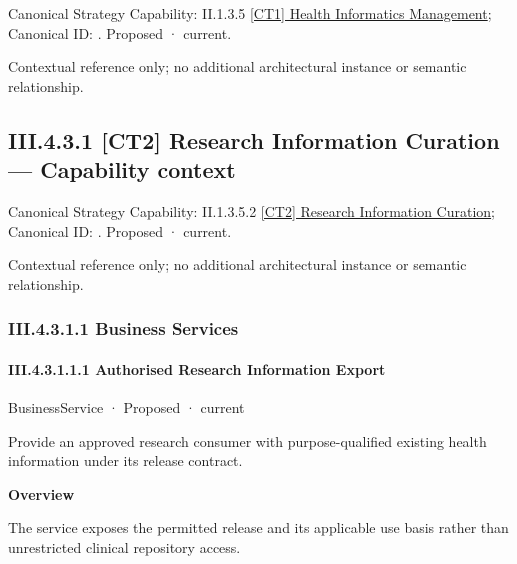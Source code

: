 {\small Canonical Strategy Capability: II.1.3.5 \hyperref[element:a790b5f2c5a1497fa6ec09d7824da32e]{[CT1] Health Informatics Management}; Canonical ID: \texttt{}. Proposed · current.}\par
Contextual reference only; no additional architectural instance or semantic relationship.\par
\subsection*{III.4.3.1 [CT2] Research Information Curation — Capability context}
\label{navigation:III.4.3.1}

{\small Canonical Strategy Capability: II.1.3.5.2 \hyperref[element:4f5b8cec90324c2989cdc30e80bc8cb9]{[CT2] Research Information Curation}; Canonical ID: \texttt{}. Proposed · current.}\par
Contextual reference only; no additional architectural instance or semantic relationship.\par
\subsubsection*{III.4.3.1.1 Business Services}
\label{navigation:III.4.3.1.1}

\paragraph*{III.4.3.1.1.1 Authorised Research Information Export}
\label{navigation:III.4.3.1.1.1}

\label{element:134e1ff0331040b3a8069c9dc5e331d4}
{\small BusinessService · Proposed · current}\par

Provide an approved research consumer with purpose-qualified existing health information under its release contract.



\textbf{Overview}



The service exposes the permitted release and its applicable use basis rather than unrestricted clinical repository access.



